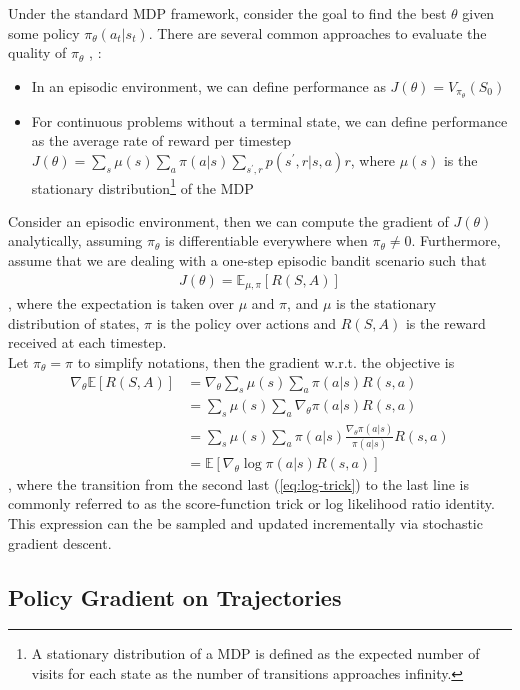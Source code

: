 \documentclass[12pt]{report}
\begin{document}
Under the standard MDP framework, consider the goal to find the best $\theta$ given some policy $\pi_\theta(a_t|s_t)$. There are several common approaches to evaluate the quality of $\pi_\theta$ \cite{sutton2018reinforcement}, \cite{sutton2000policy}:
\begin{itemize}
    \item In an episodic environment, we can define performance as $J(\theta)=V_{\pi_\theta}(S_0)$
    \item For continuous problems without a terminal state, we can define performance as the average rate of reward per timestep $J(\theta)=\sum_s\mu(s)\sum_a\pi(a|s)\sum_{s^\prime,r}p(s^\prime,r|s,a)r$, where $\mu(s)$ is the stationary distribution\footnote{A stationary distribution of a MDP is defined as the expected number of visits for each state as the number of transitions approaches infinity.} of the MDP
\end{itemize}
Consider an episodic environment, then we can compute the gradient of $J(\theta)$ analytically, assuming $\pi_\theta$ is differentiable everywhere when $\pi_\theta \neq 0$. Furthermore, assume that we are dealing with a one-step episodic bandit scenario such that
\begin{align}
    J(\theta)=\mathbb{E}_{\mu, \pi}[R(S,A)]
\end{align}
, where the expectation is taken over $\mu$ and $\pi$, and $\mu$ is the stationary distribution of states, $\pi$ is the policy over actions and $R(S,A)$ is the reward received at each timestep.\\

Let $\pi_\theta = \pi$ to simplify notations, then the gradient w.r.t. the objective is
\begin{align}
\nabla_\theta \mathbb{E}[R(S,A)] &= \nabla_\theta \sum_s \mu(s) \sum_a \pi(a|s) R(s,a) \nonumber\\
&= \sum_s \mu(s) \sum_a \nabla_\theta \pi(a|s) R(s,a) \nonumber\\
&= \sum_s \mu(s) \sum_a \pi(a|s) \frac{\nabla_\theta \pi(a|s)}{\pi(a|s)} R(s,a) \label{eq:log-trick}\\
&= \mathbb{E}[\nabla_\theta \log \pi(a|s) R(s,a)] \nonumber
\end{align}
, where the transition from the second last (\ref{eq:log-trick}) to the last line is commonly referred to as the score-function trick or log likelihood ratio identity. This expression can the be sampled and updated incrementally via stochastic gradient descent.

\subsection{Policy Gradient on Trajectories}
\end{document}
